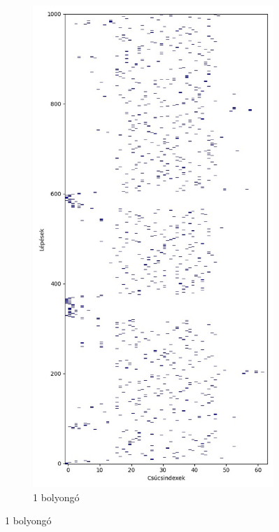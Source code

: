 \begin{figure}[H]
  \centering
  \begin{subfigure}{.40\linewidth}
    \centering
    \includegraphics[width=\linewidth]{./figures/ragasztott_binaris/sim00.jpg}
    \caption{1 bolyongó}

\end{subfigure}
\end{figure}
